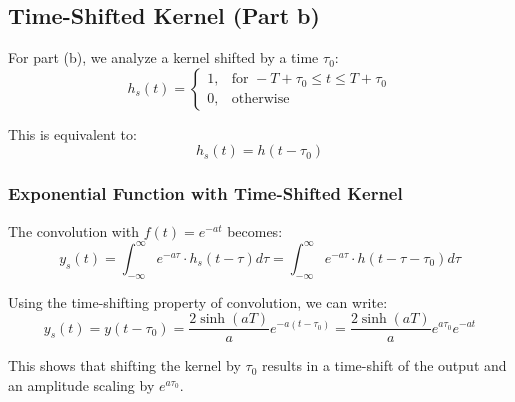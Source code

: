 \documentclass{article}
\begin{document}
	\subsection{Time-Shifted Kernel (Part b)}
	For part (b), we analyze a kernel shifted by a time $\tau_0$:
	\begin{equation}
		h_s(t) = 
		\begin{cases} 
			1, & \text{for } -T+\tau_0 \leq t \leq T+\tau_0 \\
			0, & \text{otherwise}
		\end{cases}
	\end{equation}
	
	This is equivalent to:
	\begin{equation}
		h_s(t) = h(t-\tau_0)
	\end{equation}
	
	\subsubsection{Exponential Function with Time-Shifted Kernel}
	The convolution with $f(t) = e^{-at}$ becomes:
	\begin{equation}
		y_s(t) = \int_{-\infty}^{\infty} e^{-a\tau} \cdot h_s(t - \tau) d\tau = \int_{-\infty}^{\infty} e^{-a\tau} \cdot h(t - \tau - \tau_0) d\tau
	\end{equation}
	
	Using the time-shifting property of convolution, we can write:
	\begin{equation}
		y_s(t) = y(t-\tau_0) = \frac{2\sinh(aT)}{a}e^{-a(t-\tau_0)} = \frac{2\sinh(aT)}{a}e^{a\tau_0}e^{-at}
	\end{equation}
	
	This shows that shifting the kernel by $\tau_0$ results in a time-shift of the output and an amplitude scaling by $e^{a\tau_0}$.
	
\end{document}
